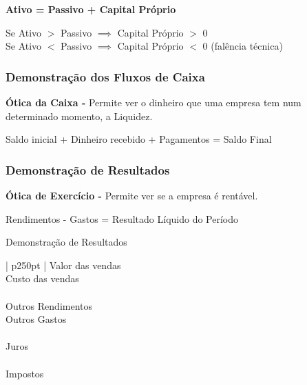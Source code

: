 \documentclass[11pt]{article}
\begin{document}
\begin{center}
    \textbf{Ativo = Passivo + Capital Próprio}
\end{center}

Se Ativo $>$ Passivo $\implies $ Capital Próprio $>$ 0 \\
Se Ativo $<$ Passivo $\implies $ Capital Próprio $<$ 0 (falência técnica)

\subsubsection{Demonstração dos Fluxos de Caixa}

\textbf{Ótica da Caixa -} Permite ver o dinheiro que uma empresa tem num determinado momento, a Liquidez.
\begin{center}
    Saldo inicial + Dinheiro recebido + Pagamentos = Saldo Final
\end{center}

\subsubsection{Demonstração de Resultados}

\textbf{Ótica de Exercício -} Permite ver se a empresa é rentável.

\begin{center}
    Rendimentos - Gastos = Resultado Líquido do Período
\end{center}

\begin{center}
    Demonstração de Resultados \\
    \begin{tabular}[t]{ | p{250pt} | }
        \hline Valor das vendas                                                   \\
        \hline Custo das vendas                                                   \\
        \hline {}              \\
        \hline Outros Rendimentos                                                 \\
        \hline Outros Gastos                                                      \\
        \hline {}        \\
        \hline Juros                                                              \\
        \hline {} \\
        \hline Impostos                                                           \\
        \hline {}            \\
        \hline
    \end{tabular}
\end{center}
\end{document}

